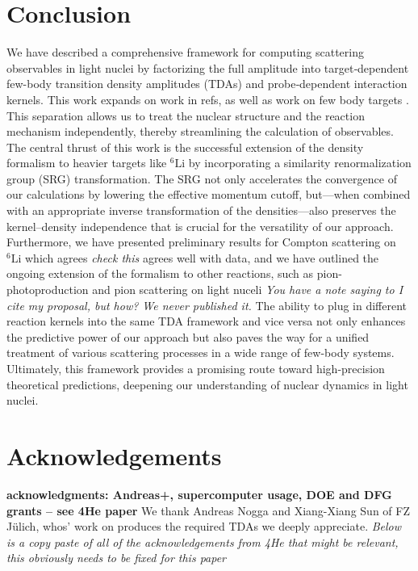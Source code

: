 \documentclass[a4paper,11pt]{article}
\newcommand{\LiS}{{}^{6} \mathrm{Li} }
\newcommand{\ques}[1]{\color{red}\textit{ #1 }\color{black}}
\newcommand{\com}[1]{\color{blue}\small\textbf{ #1 }\color{black}\normalsize}
\begin{document}
\section{Conclusion}
We have described a comprehensive framework for
computing scattering observables in light nuclei by factorizing the
full amplitude into target‐dependent few-body transition density
amplitudes (TDAs) and probe‐dependent interaction kernels. 
This work expands on work in refs, as well as work on few body targets \cite{hammer2020,hammer4He,L2013}.
This separation allows us to treat the nuclear structure and the
reaction mechanism independently, thereby streamlining the
calculation of observables.
The central thrust of this work is the successful extension of
the density formalism to heavier targets like $\LiS$ by incorporating a
similarity renormalization group (SRG) transformation.
The SRG not only accelerates the convergence of our calculations by
lowering the effective momentum cutoff, but—when combined with an
appropriate inverse transformation of the densities—also preserves
the kernel–density independence that is crucial for the versatility
of our approach.
Furthermore, we have presented preliminary results for Compton scattering on
$\LiS$ which agrees
\ques{check this}
agrees well with data, and we have outlined the ongoing extension of the formalism to other
reactions, such as pion-photoproduction and pion scattering on light nuceli\cite{upcoming} \ques{You have a note saying to I cite my proposal, but how? We never published it.}  %
The ability to plug in different reaction kernels into the same TDA
framework and vice versa not only enhances the predictive power of our approach but
also paves the way for a unified treatment of various scattering
processes in a wide range of few-body systems.
Ultimately, this framework provides a promising route toward
high-precision theoretical predictions, deepening our understanding
of nuclear dynamics in light nuclei.

\section{Acknowledgements}
\com{acknowledgments: Andreas+, supercomputer usage, DOE and DFG grants -- see 4He paper}
We thank Andreas Nogga and Xiang-Xiang Sun of FZ J{\"u}lich, whos' work on produces the required TDAs we 
deeply appreciate.
\ques{Below is a copy paste of all of the acknowledgements from 4He that might be relevant, this 
obviously needs to be fixed for this paper
}
\end{document}
